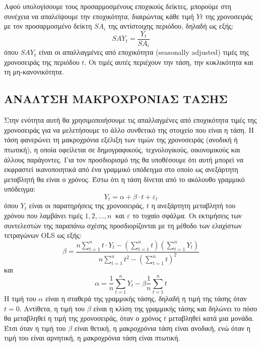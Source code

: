 Αφού υπολογίσουμε τους προσαρμοσμένους εποχικούς δείκτες, μπορούμε στη
συνέχεια να απαλείψουμε την εποχικότητα, διαιρώντας κάθε τιμή $Y t$ της χρονοσειράς
με τον προσαρμοσμένο δείκτη $SA_i$ της αντίστοιχης περιόδου, δηλαδή ως εξής:\\
$$ SAY_t=\frac{Y_t}{SA_i} $$
όπου $SAY_t$ είναι οι απαλλαγμένες από εποχικότητα (seasonally adjusted) τιμές της
χρονοσειράς της περιόδου $t$. Οι τιμές αυτές περιέχουν την τάση, την κυκλικότητα και
τη μη-κανονικότητα.
\subsection{ΑΝΑΛΥΣΗ ΜΑΚΡΟΧΡΟΝΙΑΣ ΤΑΣΗΣ}
Στην ενότητα αυτή θα χρησιμοποιήσουμε τις απαλλαγμένες από εποχικότητα
τιμές της χρονοσειράς για να μελετήσουμε το άλλο συνθετικό της στοιχείο που είναι
η τάση. Η τάση φανερώνει τη μακροχρόνια εξέλιξη των τιμών της χρονοσειράς
(ανοδική ή πτωτική), η οποία οφείλεται σε δημογραφικούς, τεχνολογικούς,
οικονομικούς και άλλους παράγοντες. Για τον προσδιορισμό της θα υποθέσουμε ότι
αυτή μπορεί να εκφραστεί ικανοποιητικά από ένα γραμμικό υπόδειγμα στο οποίο ως
ανεξάρτητη μεταβλητή θα είναι ο χρόνος. Έστω ότι η τάση δίνεται από το ακόλουθο
γραμμικό υπόδειγμα:\\
\begin{equation}
\label{palin}
Y_t=\alpha +\beta \cdot t + \varepsilon_t
\end{equation}
όπου $Y_t$ είναι οι παρατηρήσεις της χρονοσειράς, $t$ η ανεξάρτητη μεταβλητή του
χρόνου που λαμβάνει τιμές $1, 2,\ldots,n\:$ και $\varepsilon$ το τυχαίο σφάλμα. Οι εκτιμήσεις των
συντελεστών της παραπάνω σχέσης προσδιορίζονται με τη μέθοδο των ελαχίστων
τετραγώνων OLS ως εξής:\\
$$ \beta= \frac{n\sum_{t=1}^n t \cdot Y_t -\left(\sum_{t=1}^n t \right) \left( \sum_{t=1}^n Y_t \right)}{n \sum_{t=1}^n t^2 -\left( \sum_{t=1}^n t \right)^2} $$
και\\
$$ \alpha=\frac{1}{n} \sum_{t=1}^n Y_t -\beta \frac{1}{n} \sum_{t=1}^n t $$
Η τιμή του $\alpha $ είναι η σταθερά της γραμμικής τάσης, δηλαδή η τιμή της τάσης όταν
$t=0$. Αντίθετα, η τιμή του $\beta $ είναι η κλίση της γραμμικής τάσης και δηλώνει το πόσο
θα μεταβληθεί η τιμή της χρονοσειράς, όταν ο χρόνος $t$ μεταβληθεί κατά μια μονάδα.
Έτσι όταν η τιμή του $\beta $ είναι θετική, η μακροχρόνια τάση είναι ανοδική, ενώ όταν η
τιμή του είναι αρνητική, η μακροχρόνια τάση είναι πτωτική.

